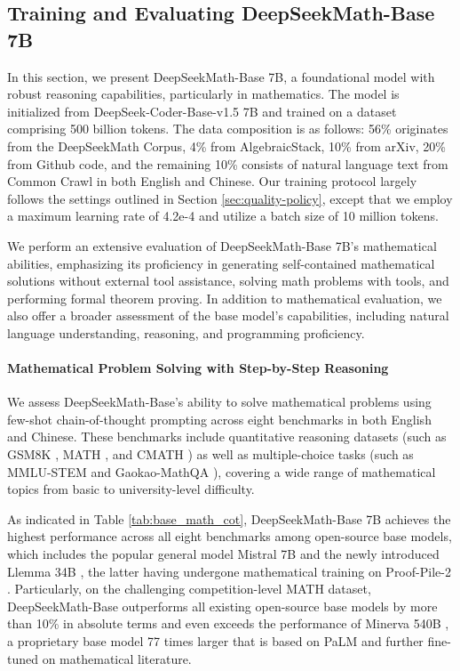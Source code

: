 \subsection{Training and Evaluating DeepSeekMath-Base 7B}

In this section, we present DeepSeekMath-Base 7B, a foundational model with robust reasoning capabilities, particularly in mathematics. The model is initialized from DeepSeek-Coder-Base-v1.5 7B \citep{deepseek-coder} and trained on a dataset comprising 500 billion tokens. The data composition is as follows: 56\% originates from the DeepSeekMath Corpus, 4\% from AlgebraicStack, 10\% from arXiv, 20\% from Github code, and the remaining 10\% consists of natural language text from Common Crawl in both English and Chinese. Our training protocol largely follows the settings outlined in Section \ref{sec:quality-policy}, except that we employ a maximum learning rate of 4.2e-4 and utilize a batch size of 10 million tokens.

We perform an extensive evaluation of DeepSeekMath-Base 7B’s mathematical abilities, emphasizing its proficiency in generating self-contained mathematical solutions without external tool assistance, solving math problems with tools, and performing formal theorem proving. In addition to mathematical evaluation, we also offer a broader assessment of the base model’s capabilities, including natural language understanding, reasoning, and programming proficiency.

\paragraph{Mathematical Problem Solving with Step-by-Step Reasoning}

We assess DeepSeekMath-Base’s ability to solve mathematical problems using few-shot chain-of-thought prompting \citep{cot} across eight benchmarks in both English and Chinese. These benchmarks include quantitative reasoning datasets (such as GSM8K \citep{gsm8k}, MATH \citep{MATH}, and CMATH \citep{wei2023cmath}) as well as multiple-choice tasks (such as MMLU-STEM \citep{mmlu} and Gaokao-MathQA \citep{agieval}), covering a wide range of mathematical topics from basic to university-level difficulty.

As indicated in Table \ref{tab:base_math_cot}, DeepSeekMath-Base 7B achieves the highest performance across all eight benchmarks among open-source base models, which includes the popular general model Mistral 7B \citep{mistral} and the newly introduced Llemma 34B \citep{llemma}, the latter having undergone mathematical training on Proof-Pile-2 \citep{llemma}. Particularly, on the challenging competition-level MATH dataset, DeepSeekMath-Base outperforms all existing open-source base models by more than 10\% in absolute terms and even exceeds the performance of Minerva 540B \citep{minerva}, a proprietary base model 77 times larger that is based on PaLM \citep{palm} and further fine-tuned on mathematical literature.

